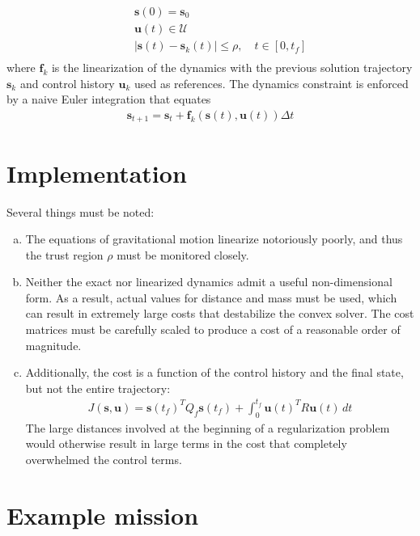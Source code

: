 \documentclass{article}
\begin{document}
\begin{multicols}{2}
\begin{align*}
	&\quad \mathbf{s}(0) = \mathbf{s}_{0}\\
	&\quad \mathbf{u}(t) \in \mathcal{U}\\
	&\quad |\mathbf{s}(t) - \mathbf{s}_{k}(t)| \le \rho, \quad t \in [0,t_{f}]\\
\end{align*}
where $\mathbf{f}_{k}$ is the linearization of the dynamics with the previous solution trajectory $\mathbf{s}_{k}$ and control history $\mathbf{u}_{k}$ used as references. The dynamics constraint is enforced by a naive Euler integration that equates 
\begin{align*}
	\mathbf{s}_{t+1} = \mathbf{s}_{t} + \mathbf{f}_{k}(\mathbf{s}(t), \mathbf{u}(t))\Delta t
\end{align*}


\section*{Implementation}
Several things must be noted:
\begin{enumerate}[(a)]
	\setlength{\itemsep}{0pt}
	\setlength{\parskip}{0pt}
	\item The equations of gravitational motion linearize notoriously poorly, and thus the trust region $\rho$ must be monitored closely.
	\item Neither the exact nor linearized dynamics admit a useful non-dimensional form. As a result, actual values for distance and mass must be used, which can result in extremely large costs that destabilize the convex solver. The cost matrices must be carefully scaled to produce a cost of a reasonable order of magnitude.
	\item Additionally, the cost is a function of the control history and the final state, but not the entire trajectory:
	\begin{align*}
		J(\mathbf{s}, \mathbf{u}) = \mathbf{s}(t_{f})^{T}Q_{f}\mathbf{s}(t_{f}) + \int_{0}^{t_{f}} \mathbf{u}(t)^{T}R\mathbf{u}(t)\,dt
	\end{align*}
	The large distances involved at the beginning of a regularization problem would otherwise result in large terms in the cost that completely overwhelmed the control terms.
\end{enumerate}


\section*{Example mission}

\section*{}

\end{multicols}
\end{document}
